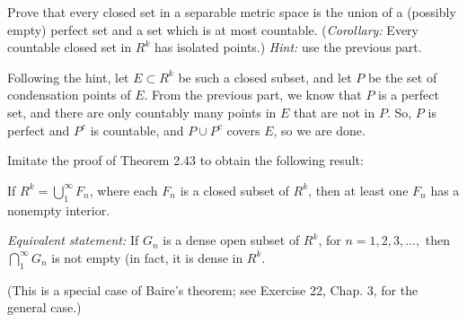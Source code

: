 \documentclass[10pt]{article}
\begin{document}
	\begin{problem}
		Prove that every closed set in a separable metric space is the union of a (possibly empty) perfect 
		set and a set which is at most countable. (\textit{Corollary:} Every countable closed 
		set in \( R^{k} \) has isolated points.) \textit{Hint:} use the previous part. 
	\end{problem}

	\begin{solution}
		Following the hint, let \( E \subset R^{k} \) be such a closed subset, and let \( P \) be the set of
		condensation points of \( E \). From the previous part, we know that \( P \) is a perfect set, and
		there are only countably many points in \( E \) that are not in \( P \). So, \( P \) is perfect and
		\( P^{c} \) is countable, and \( P \cup P^{c} \) covers \( E \), so we are done.   
	\end{solution}

	\begin{problem}
		Imitate the proof of Theorem 2.43 to obtain the following result: 
		\begin{center}
			\begin{minipage}{0.9\textwidth} 
				If \( R^{k} = \bigcup_1^{\infty} F_n \), where each \( F_n \) is a closed subset of \( R^{k} \), 
				then at least one \( F_n \) has a nonempty interior. 

				\textit{Equivalent statement:} If \( G_n \) is a dense open subset of \( R^{k} \), 
				for \( n = 1, 2, 3, \dots,  \) then \( \bigcap_1^{\infty}G_n \) is not empty 
				(in fact, it is dense in \( R^{k} \). 
			\end{minipage}
		\end{center}
		(This is a special case of Baire's theorem; see Exercise 22, Chap. 3, for the general case.)
	\end{problem}
\end{document}
